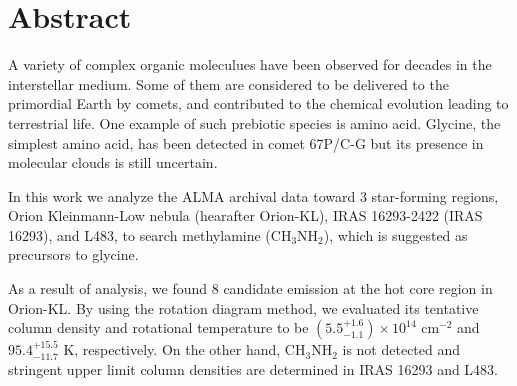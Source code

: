 \chapter*{Abstract}

\singlespacing
\doublespacing

A variety of complex organic moleculues have been observed for decades in the interstellar medium.
Some of them are considered to be delivered to the primordial Earth by comets, 
and contributed to the chemical evolution leading to terrestrial life.
One example of such prebiotic species is amino acid. Glycine, the simplest amino acid, 
has been detected in comet 67P/C-G but its presence in molecular clouds is still uncertain.

In this work we analyze the ALMA archival data toward 3 star-forming regions, 
Orion Kleinmann-Low nebula (hearafter Orion-KL), IRAS 16293-2422 (IRAS 16293), and L483,
to search methylamine (CH$_3$NH$_2$), which is suggested as precursors to glycine. 

As a result of analysis, we found 8 candidate emission at the hot core region in Orion-KL.
By using the rotation diagram method, we evaluated its tentative column density 
and rotational temperature to be $(5.5^{+1.6}_{-1.1} ) \times 10^{14}$ cm$^{-2}$ and $95.4^{+15.5}_{-11.7} \,\,\mathrm{K}$, respectively. 
On the other hand, CH$_3$NH$_2$ is not detected and stringent upper limit column densities
are determined in IRAS 16293 and L483.